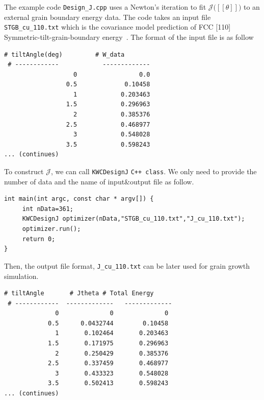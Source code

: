 \documentclass[11pt]{article}
\begin{document}
The example code \texttt{Design\_J.cpp} uses a Newton's iteration 
to fit $\mathcal{J}\big( [\![ \theta]\!]\big)$ to an external grain boundary energy data. 
The code takes an input file \texttt{STGB\_cu\_110.txt} which is 
the covariance model prediction of FCC [110] Symmetric-tilt-grain-boundary energy~\cite{Runnels:2016_1,Runnels:2016_2}. 
The format of the input file is as follow\\

\begin{tcolorbox}[colback=white]
\begin{lstlisting}[basicstyle=\footnotesize]
 # tiltAngle(deg)         # W_data
 # ------------            -------------  
                   0        	     0.0
                 0.5             0.10458
                   1            0.203463
                 1.5            0.296963
                   2            0.385376
                 2.5            0.468977
                   3            0.548028
                 3.5            0.598243
... (continues)
\end{lstlisting}
\end{tcolorbox}       

To construct $\mathcal{J}$, we can call \texttt{KWCDesignJ} \texttt{C++ class}.
We only need to provide the number of data and the name of input\&output file as follow.\\

\begin{tcolorbox}
\begin{lstlisting}[basicstyle=\footnotesize]
int main(int argc, const char * argv[]) {
     int nData=361;
     KWCDesignJ optimizer(nData,"STGB_cu_110.txt","J_cu_110.txt");
     optimizer.run(); 
     return 0;
}
\end{lstlisting}
\end{tcolorbox}


Then, the output file format, \texttt{J\_cu\_110.txt} can be later used for grain growth simulation.\\
\begin{tcolorbox}[colback=white]
\begin{lstlisting}[basicstyle=\footnotesize]
    # tiltAngle       # Jtheta # Total Energy
 # ------------  -------------   -------------
              0              0              0
            0.5      0.0432744        0.10458
              1       0.102464       0.203463
            1.5       0.171975       0.296963
              2       0.250429       0.385376
            2.5       0.337459       0.468977
              3       0.433323       0.548028
            3.5       0.502413       0.598243
... (continues)
\end{lstlisting}
\end{tcolorbox}      
\end{document}
